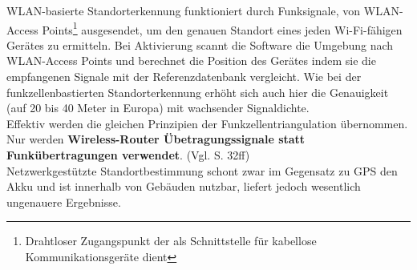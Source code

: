 \gls{WLAN}-basierte Standorterkennung funktioniert durch Funksignale, von \gls{WLAN}-Access Points\footnote{ Drahtloser Zugangspunkt der als Schnittstelle für kabellose Kommunikationsgeräte dient} ausgesendet, um den genauen Standort eines jeden Wi-Fi-fähigen Gerätes zu ermitteln. Bei Aktivierung scannt die Software die Umgebung nach \gls{WLAN}-Access Points und berechnet die Position des Gerätes indem sie die empfangenen Signale mit der Referenzdatenbank vergleicht. Wie bei der funkzellenbastierten Standorterkennung erhöht sich auch hier die Genauigkeit (auf 20 bis 40 Meter in Europa) mit wachsender Signaldichte. \\
Effektiv werden die gleichen Prinzipien der Funkzellentriangulation übernommen. Nur werden \textbf{Wireless-Router Übetragungssignale statt Funkübertragungen verwendet}. (Vgl. \cite{gps} S. 32ff) \\
Netzwerkgestützte Standortbestimmung schont zwar im Gegensatz zu \gls{GPS} den Akku und ist innerhalb von Gebäuden nutzbar, liefert jedoch wesentlich ungenauere Ergebnisse.
